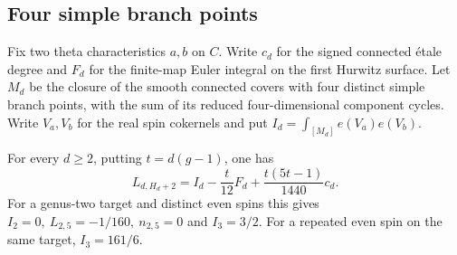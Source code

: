 \subsection{Four simple branch points}\label{sec:excess}
Fix two theta characteristics \(a,b\) on \(C\). Write \(c_d\) for the signed connected étale degree and \(F_d\) for the finite-map Euler integral on the first Hurwitz surface. Let \(M_d\) be the closure of the smooth connected covers with four distinct simple branch points, with the sum of its reduced four-dimensional component cycles. Write \(V_a,V_b\) for the real spin cokernels and put \(I_d=\int_{[M_d]}e(V_a)e(V_b)\).
\begin{proposition}\label{prop:excess}
For every \(d\ge2\), putting \(t=d(g-1)\), one has
\[
 L_{d,H_d+2}=I_d-\frac{t}{12}F_d+\frac{t(5t-1)}{1440}c_d.
\]
For a genus-two target and distinct even spins this gives \(I_2=0,\ L_{2,5}=-1/160,\ n_{2,5}=0\) and \(I_3=3/2\). For a repeated even spin on the same target, \(I_3=161/6\).
\end{proposition}
